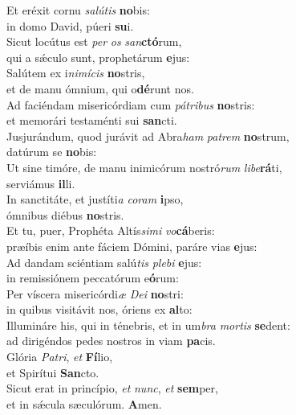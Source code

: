 \evenverse Et eréxit cornu \textit{sa}\textit{lú}\textit{tis} \textbf{no}bis:~\*\\
\evenverse in domo David, púeri \textbf{su}i.\\
\oddverse Sicut locútus est \textit{per} \textit{os} \textit{san}\textbf{ctó}rum,~\*\\
\oddverse qui a sǽculo sunt, prophetárum \textbf{e}jus:\\
\evenverse Salútem ex i\textit{ni}\textit{mí}\textit{cis} \textbf{no}stris,~\*\\
\evenverse et de manu ómnium, qui o\textbf{dé}runt nos.\\
\oddverse Ad faciéndam misericórdiam cum \textit{pá}\textit{tri}\textit{bus} \textbf{no}stris:~\*\\
\oddverse et memorári testaménti sui \textbf{san}cti.\\
\evenverse Jusjurándum, quod jurávit ad Abra\textit{ham} \textit{pa}\textit{trem} \textbf{no}strum,~\*\\
\evenverse datúrum se \textbf{no}bis:\\
\oddverse Ut sine timóre, de manu inimicórum nostró\textit{rum} \textit{li}\textit{be}\textbf{rá}ti,~\*\\
\oddverse serviámus \textbf{il}li.\\
\evenverse In sanctitáte, et justíti\textit{a} \textit{co}\textit{ram} \textbf{i}pso,~\*\\
\evenverse ómnibus diébus \textbf{no}stris.\\
\oddverse Et tu, puer, Prophéta Altís\textit{si}\textit{mi} \textit{vo}\textbf{cá}beris:~\*\\
\oddverse præíbis enim ante fáciem Dómini, paráre vias \textbf{e}jus:\\
\evenverse Ad dandam sciéntiam salú\textit{tis} \textit{ple}\textit{bi} \textbf{e}jus:~\*\\
\evenverse in remissiónem peccatórum e\textbf{ó}rum:\\
\oddverse Per víscera misericórdi\textit{æ} \textit{De}\textit{i} \textbf{no}stri:~\*\\
\oddverse in quibus visitávit nos, óriens ex \textbf{al}to:\\
\evenverse Illumináre his, qui in ténebris, et in um\textit{bra} \textit{mor}\textit{tis} \textbf{se}dent:~\*\\
\evenverse ad dirigéndos pedes nostros in viam \textbf{pa}cis.\\
\oddverse Glória \textit{Pa}\textit{tri}, \textit{et} \textbf{Fí}lio,~\*\\
\oddverse et Spirítui \textbf{San}cto.\\
\evenverse Sicut erat in princípio, \textit{et} \textit{nunc}, \textit{et} \textbf{sem}per,~\*\\
\evenverse et in sǽcula sæculórum. \textbf{A}men.\\
